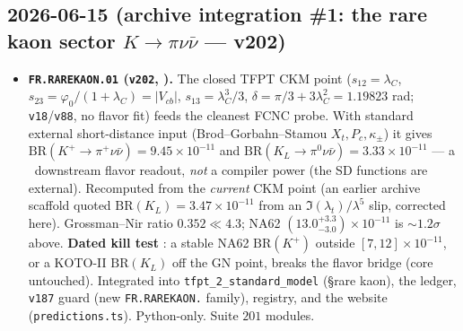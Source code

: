 \documentclass[11pt]{article}
\providecommand{\vref}[1]{\texttt{#1}}
\begin{document}
\subsection*{2026-06-15 (archive integration \#1: the rare kaon sector $K\to\pi\nu\bar\nu$ --- v202)}
\begin{itemize}
\item \textbf{\texttt{FR.RAREKAON.01} (\vref{v202}, \mC).} The closed TFPT CKM point ($s_{12}{=}\lambda_C$,
  $s_{23}{=}\varphi_0/(1{+}\lambda_C){=}|V_{cb}|$, $s_{13}{=}\lambda_C^3/3$, $\delta{=}\pi/3{+}3\lambda_C^2{=}1.19823$
  rad; \vref{v18}/\vref{v88}, no flavor fit) feeds the cleanest FCNC probe. With standard external
  short-distance input (Brod--Gorbahn--Stamou $X_t,P_c,\kappa_\pm$) it gives
  $\mathrm{BR}(K^+\!\to\pi^+\nu\bar\nu)=9.45\times10^{-11}$ and $\mathrm{BR}(K_L\to\pi^0\nu\bar\nu)=3.33\times10^{-11}$
  --- a \mC\ downstream flavor readout, \emph{not} a compiler power (the SD functions are external). Recomputed
  from the \emph{current} CKM point (an earlier archive scaffold quoted $\mathrm{BR}(K_L)=3.47\times10^{-11}$
  from an $\Im(\lambda_t)/\lambda^5$ slip, corrected here). Grossman--Nir ratio $0.352\ll4.3$; NA62
  $(13.0^{+3.3}_{-3.0})\times10^{-11}$ is $\sim1.2\sigma$ above. \textbf{Dated kill test \mX}: a stable NA62
  $\mathrm{BR}(K^+)$ outside $[7,12]\times10^{-11}$, or a KOTO-II $\mathrm{BR}(K_L)$ off the GN point, breaks the
  flavor bridge (core untouched). Integrated into \texttt{tfpt\_2\_standard\_model} (\S rare kaon), the ledger,
  \vref{v187} guard (new \texttt{FR.RAREKAON.} family), registry, and the website (\texttt{predictions.ts}).
  Python-only. Suite $201$ modules.
\end{itemize}
\end{document}
